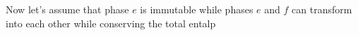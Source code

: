 Now let's assume that phase \(e\) is immutable while phases \(e\) and \(f\) can transform into each other while conserving the total entalp